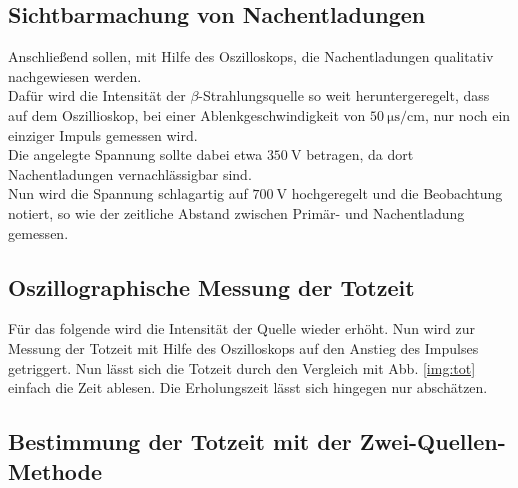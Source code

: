 \subsection{Sichtbarmachung von Nachentladungen}


\noindent
Anschließend sollen, mit Hilfe des Oszilloskops, die Nachentladungen qualitativ nachgewiesen werden.\\
Dafür wird die Intensität der $\beta$-Strahlungsquelle so weit heruntergeregelt, dass auf dem Oszillioskop, bei einer Ablenkgeschwindigkeit von $\SI{50}{\micro\second\per\centi\metre}$, 
nur noch ein einziger Impuls gemessen wird. \\
Die angelegte Spannung sollte dabei etwa $\SI{350}{\volt}$ betragen, da dort Nachentladungen vernachlässigbar sind.\\
Nun wird die Spannung schlagartig auf $\SI{700}{\volt}$ hochgeregelt und die Beobachtung notiert, so wie der zeitliche Abstand zwischen Primär- und Nachentladung gemessen.

\subsection{Oszillographische Messung der Totzeit}


\noindent
Für das folgende wird die Intensität der Quelle wieder erhöht.
Nun wird zur Messung der Totzeit mit Hilfe des Oszilloskops auf den Anstieg des Impulses getriggert.
Nun lässt sich die Totzeit durch den Vergleich mit Abb. \ref{img:tot} einfach die Zeit ablesen. Die Erholungszeit lässt sich hingegen nur abschätzen.

\subsection{Bestimmung der Totzeit mit der Zwei-Quellen-Methode}


